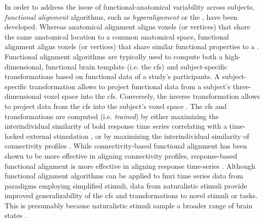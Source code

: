 %
%
In order to address the issue of functional-anatomical variability across
subjects, \textit{functional alignment} algorithms, such as
\textit{hyperalignment} \citep{haxby2011common, guntupalli2016model} or the
 \citep{chen2015reduced, zhang2016searchlight}, have been developed.
%
Whereas anatomical alignment aligns voxels (or vertices) that share the same
anatomical location to a common anatomical space, functional alignment aligns
voxels (or vertices) that share similar functional properties to a .
%
Functional alignment algorithms are typically used to compute both a
high-dimensional, functional brain template (i.e. the \ac{cfs}) and
subject-specific transformations based on functional data of a study's
participants.
%
A subject-specific transformation allows to project functional data from a
subject's three-dimensional voxel space into the \ac{cfs}.
%
Conversely, the inverse transformation allows to project data from the \ac{cfs}
into the subject's voxel space \citep{haxby2020hyperalignment,
kumar2020brainiak}.
%
The \ac{cfs} and transformations are computed (i.e. \textit{trained}) by either
maximizing the interindividual similarity of \ac{bold} response time series
correlating with a time-locked external stimulation \citep{haxby2011common,
chen2015reduced, sabuncu2010function}, or by maximizing the interindividual
similarity of connectivity profiles \citep{feilong2018reliable,
guntupalli2018computational, nastase2019leveraging}.
%
While connectivity-based functional alignment has been shown to be more
effective in aligning connectivity profiles, response-based functional alignment
is more effective in aligning response time-series
\citep{guntupalli2018computational}.
%
Although functional alignment algorithms can be applied to \ac{fmri} time series
data from paradigms employing simplified stimuli, data from naturalistic stimuli
provide
%
improved generalizability of the \ac{cfs}
%
and transformations
%
to novel stimuli or tasks.
%
This is presumably because naturalistic stimuli sample a broader range of brain
states \citep{haxby2011common, guntupalli2016model}.

